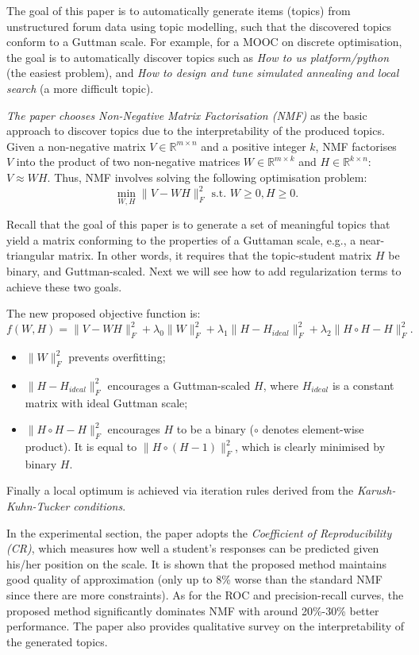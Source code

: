 \documentclass[paper=a4, fontsize=18pt]{article} %
\numberwithin{equation}{section} %
\numberwithin{figure}{section} %
\numberwithin{table}{section} %
\begin{document}
The goal of this paper is to automatically generate items (topics) from unstructured forum data using topic modelling, such that the discovered topics conform to a Guttman scale. For example, for a MOOC on discrete optimisation, the goal is to automatically discover topics such as \emph{How to us platform/python} (the easiest problem), and \emph{How to design and tune simulated annealing and local search} (a more difficult topic).

\emph{The paper chooses Non-Negative Matrix Factorisation (NMF)} as the basic approach to discover topics due to the interpretability of the produced topics. Given a non-negative matrix $V \in \mathbb{R}^{m \times n}$ and a positive integer $k$, NMF factorises $V$ into the product of two non-negative matrices $W \in \mathbb{R}^{m \times k}$ and $H \in \mathbb{R}^{k \times n}$: $V \approx WH$. Thus, NMF involves solving the following optimisation problem:
$$\min_{W,H} \| V - WH \|_F^2 \mbox{ s.t. } W \geq 0, H \geq 0.$$

Recall that the goal of this paper is to generate a set of meaningful topics that yield a matrix conforming to the properties of a Guttaman scale, e.g., a near-triangular matrix. In other words, it requires that the topic-student matrix $H$ be binary, and Guttman-scaled. Next we will see how to add regularization terms to achieve these two goals.

The new proposed objective function is:
$$f(W,H) = \| V - WH \|_F^2 + \lambda_0 \| W \|_F^2 + \lambda_1 \| H - H_{ideal} \|_F^2 + \lambda_2 \| H \circ H - H \|_F^2.$$
\begin{itemize}
\item $\| W \|_F^2$ prevents overfitting;
\item $\| H - H_{ideal} \|_F^2$ encourages a Guttman-scaled $H$, where $H_{ideal}$ is a constant matrix with ideal Guttman scale;
\item $\| H \circ H - H \|_F^2$ encourages $H$ to be a binary ($\circ$ denotes element-wise product). It is equal to $\| H \circ (H - 1) \|_F^2$, which is clearly minimised by binary $H$.
\end{itemize}
Finally a local optimum is achieved via iteration rules derived from the \emph{Karush-Kuhn-Tucker conditions}.

In the experimental section, the paper adopts the \emph{Coefficient of Reproducibility (CR)}, which measures how well a student's responses can be predicted given his/her position on the scale. It is shown that the proposed method maintains good quality of approximation (only up to 8\% worse than the standard NMF since there are more constraints). As for the ROC and precision-recall curves, the proposed method significantly dominates NMF with around 20\%-30\% better performance. The paper also provides qualitative survey on the interpretability of the generated topics.
\end{document}
